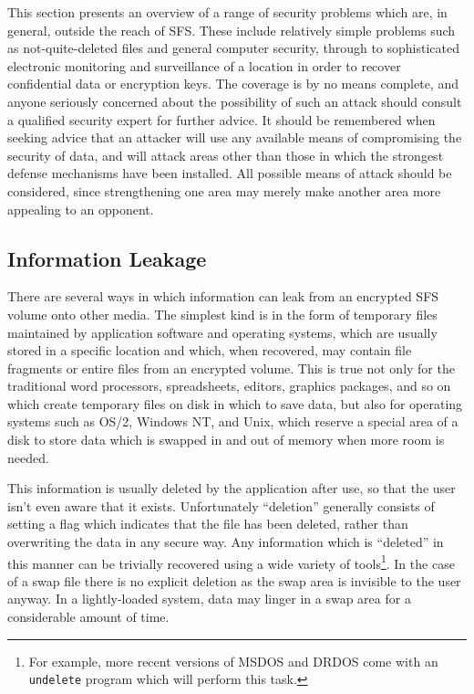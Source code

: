 This section presents an overview of a range of security problems which are, in
general, outside the reach of SFS.  These include relatively simple problems
such as not-quite-deleted files and general computer security, through to
sophisticated electronic monitoring and surveillance of a location in order to
recover confidential data or encryption keys.  The coverage is by no means
complete, and anyone seriously concerned about the possibility of such an
attack should consult a qualified security expert for further advice.  It
should be remembered when seeking advice that an attacker will use any
available means of compromising the security of data, and will attack areas
other than those in which the strongest defense mechanisms have been installed.
All possible means of attack should be considered, since strengthening one area
may merely make another area more appealing to an opponent.


\subsection{Information Leakage}

There are several ways in which information can leak from an encrypted SFS
volume onto other media.  The simplest kind is in the form of temporary files
maintained by application software and operating systems, which are usually
stored in a specific location and which, when recovered, may contain file
fragments or entire files from an encrypted volume.  This is true not only for
the traditional word processors, spreadsheets, editors, graphics packages, and
so on which create temporary files on disk in which to save data, but also for
operating systems such as OS/2, Windows NT, and Unix, which reserve a special
area of a disk to store data which is swapped in and out of memory when more
room is needed.

This information is usually deleted by the application after use, so that the
user isn't even aware that it exists.  Unfortunately ``deletion'' generally
consists of setting a flag which indicates that the file has been deleted,
rather than overwriting the data in any secure way.  Any information which is
``deleted'' in this manner can be trivially recovered using a wide variety of
tools\footnote{
		For example, more recent versions of MSDOS and DRDOS come with an
              	{\tt undelete} program which will perform this task.
}.  In the case of a swap file there is no explicit deletion as the swap
area is invisible to the user anyway. In a lightly-loaded system, data may
linger in a swap area for a considerable amount of time.

